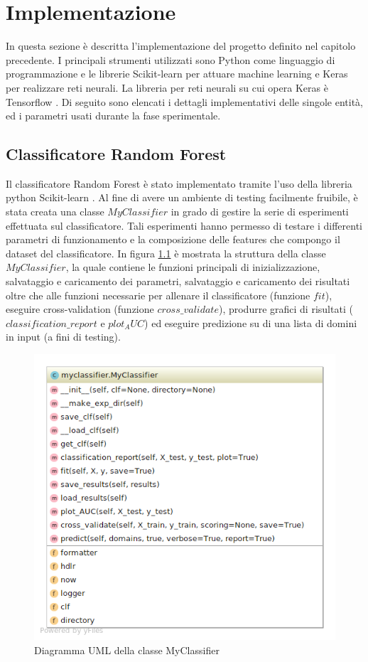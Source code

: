 \chapter{Implementazione}
\label{implementazione}
In questa sezione è descritta l'implementazione del progetto definito nel capitolo precedente. I principali strumenti utilizzati sono Python come linguaggio di programmazione e le librerie Scikit-learn \cite{sklearn} per attuare machine learning e Keras \cite{keras} per realizzare reti neurali. La libreria per reti neurali su cui opera Keras è Tensorflow \cite{tensorflow}.
Di seguito sono elencati i dettagli implementativi delle singole entità, ed i parametri usati durante la fase sperimentale.

\newpage
\section{Classificatore Random Forest}
\label{imp:randomforest}
Il classificatore Random Forest è stato implementato tramite l'uso della libreria python Scikit-learn \cite{sklearn}. 
Al fine di avere un ambiente di testing facilmente fruibile, è stata creata una classe $MyClassifier$ in grado di gestire la serie di esperimenti effettuata sul classificatore. Tali esperimenti hanno permesso di testare i differenti parametri di funzionamento e la composizione delle features che compongo il dataset del classificatore. In figura \ref{fig:uml_randomforest} è mostrata la struttura della classe $MyClassifier$, la quale contiene le funzioni principali di inizializzazione, salvataggio e caricamento dei parametri, salvataggio e caricamento dei risultati oltre che alle funzioni necessarie per allenare il classificatore (funzione $fit$), eseguire cross-validation (funzione $cross\_validate$), produrre grafici di risultati ($classification\_report$ e $plot_AUC$) ed eseguire predizione su di una lista di domini in input (a fini di testing).

\begin{figure}[!htb]
	\centering
	\includegraphics[width=0.7\columnwidth]{figures/uml_randomforest.png}
	\caption{Diagramma UML della classe MyClassifier 			\label{fig:uml_randomforest}}
\end{figure}


